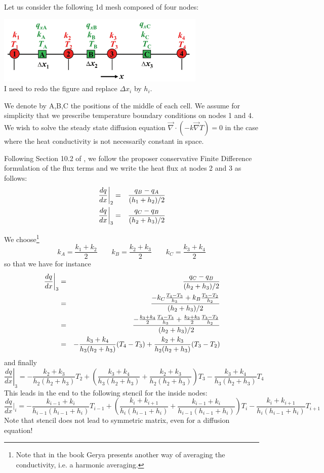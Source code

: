Let us consider the following 1d mesh composed of four nodes:
\begin{center}
\includegraphics[width=10cm]{python_codes/fieldstone_180/gerya_stencil}\\
{\captionfont I need to redo the figure and replace $\Delta x_i$ by $h_i$.}
\end{center}
We denote by A,B,C the positions of the middle of each cell.
We assume for simplicity that we prescribe temperature 
boundary conditions on nodes 1 and 4.
We wish to solve the steady state diffusion equation $\vec\nabla \cdot (-k \vec\nabla T)=0$
in the case where the heat conductivity is not necessarily constant in space.

Following Section 10.2 of \textcite{gery19book}, we follow the
proposer conservative Finite Difference formulation of the flux terms
and we write the heat flux at nodes 2 and 3 as follows:
\begin{eqnarray}
\left.\frac{dq}{dx}\right|_2 &=& \frac{q_B-q_A}{(h_1+h_2)/2} \nonumber\\
\left.\frac{dq}{dx}\right|_3 &=& \frac{q_C-q_B}{(h_2+h_3)/2} \nonumber
\end{eqnarray}

We choose\footnote{Note that in the book Gerya presents 
another way of averaging the conductivity, i.e. a harmonic averaging.} 
\[
k_A = \frac{k_1+k_2}{2}
\qquad
k_B = \frac{k_2+k_3}{2}
\qquad
k_C = \frac{k_3+k_4}{2}
\]
so that we have for instance
\begin{eqnarray}
\left.\frac{dq}{dx}\right|_3
&=& \frac{q_C-q_B}{(h_2+h_3)/2} \nonumber\\
&=& \frac{-k_C \frac{T_4-T_3}{h_3} + k_B \frac{T_3-T_2}{h_2}  }{(h_2+h_3)/2} \nonumber\\
&=& \frac{- \frac{k_3+k_4}{2} \frac{T_4-T_3}{h_3} + \frac{k_2+k_3}{2} \frac{T_3-T_2}{h_2}  }{(h_2+h_3)/2} \nonumber\\
&=& -\frac{k_3+k_4}{h_3(h_2+h_3)} (T_4-T_3)+  \frac{k_2+k_3}{h_2(h_2+h_3)} (T_3-T_2)\nonumber
\end{eqnarray}
and finally
\[
\left.\frac{dq}{dx}\right|_3
=
-\frac{k_2+k_3}{h_2(h_2+h_3)} T_2
+ \left(
\frac{k_3+k_4}{h_3(h_2+h_3)} + \frac{k_2+k_3}{h_2(h_2+h_3)} 
\right) T_3
-\frac{k_3+k_4}{h_3(h_2+h_3)} T_4
\]
This leads in the end to the following stencil for the inside nodes:
\[
\frac{dq}{dx}|_i
= - \frac{k_{i-1}+k_i}{h_{i-1} (h_{i-1}+h_i)} T_{i-1}
+\left(
\frac{k_{i}+k_{i+1}}{h_{i} (h_{i-1}+h_i)} +
\frac{k_{i-1}+k_i}{h_{i-1} (h_{i-1}+h_i)}
\right) T_i
 - \frac{k_{i}+k_{i+1}}{h_{i} (h_{i-1}+h_i)} T_{i+1}
\]
Note that stencil does not lead to symmetric matrix, even for a diffusion equation!

